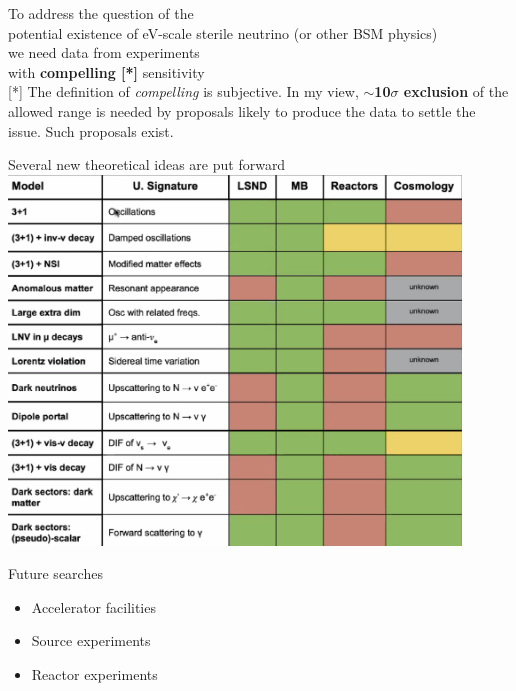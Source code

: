 \begin{frame}[plain,c]
\begin{center}
{\Large To address the question of the \\
potential existence of eV-scale sterile neutrino (or other BSM physics)\\
we need data from experiments\\ with {\bf compelling [*]} sensitivity}\\
\vspace{2cm}
[*] The definition of {\em compelling} is subjective. In my view, {\bf $\sim$10$\sigma$ exclusion} of the allowed range is needed
by proposals likely to produce the data to settle the issue. Such proposals exist.
\end{center}
\end{frame}

\begin{frame}[plain,c]
\begin{center}
  Several new theoretical ideas are put forward\\
  \vspace{0.2cm}
  \includegraphics[width=0.90\textwidth]{./images/beyond3nu/new_models}
\end{center}
\end{frame}


\begin{frame}[t]{Future searches}

\begin{itemize}
\item Accelerator facilities
\item Source experiments
\item Reactor experiments
\end{itemize}

\end{frame}


